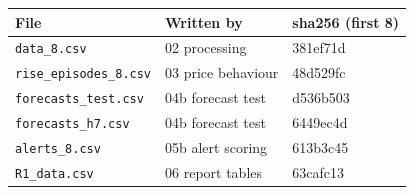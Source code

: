 \begin{tabular}{lll}
\toprule
\textbf{File} & \textbf{Written by} & \textbf{sha256 (first 8)} \\
\midrule
\texttt{data\_8.csv} & 02 processing & 381ef71d \\
\texttt{rise\_episodes\_8.csv} & 03 price behaviour & 48d529fc \\
\texttt{forecasts\_test.csv} & 04b forecast test & d536b503 \\
\texttt{forecasts\_h7.csv} & 04b forecast test & 6449ec4d \\
\texttt{alerts\_8.csv} & 05b alert scoring & 613b3c45 \\
\texttt{R1\_data.csv} & 06 report tables & 63cafc13 \\
\bottomrule
\end{tabular}
